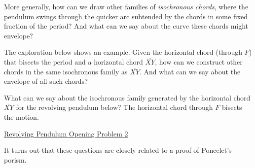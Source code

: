 \documentclass{ximera}
\begin{document}



More generally, how can we draw other families of \emph{isochronous chords}, where the pendulum swings through the quicker arc subtended by the chords in some fixed fraction of the period?  And what can we say about the curve these chords might envelope?

The exploration below shows an example. Given the horizontal chord (through $F$) that bisects the period and a horizontal chord $\overline{XY}$, how can we construct other chords in the same isochronous family as $\overline{XY}$. And what can we say about the envelope of all such chords?




\begin{exploration}
What can we say about the isochronous family generated by the horizontal chord $\overline{XY}$ for the revolving pendulum below? The horizontal chord through $F$ bisects the motion.

\begin{onlineOnly}
    \begin{center}
\end{center}
\end{onlineOnly}

\href{https://www.desmos.com/calculator/1kyfdn6yyc}{Revolving Pendulum Opening Problem 2}

\end{exploration}

It turns out that these questions are closely related to a proof of Poncelet's porism. %
\end{document}
